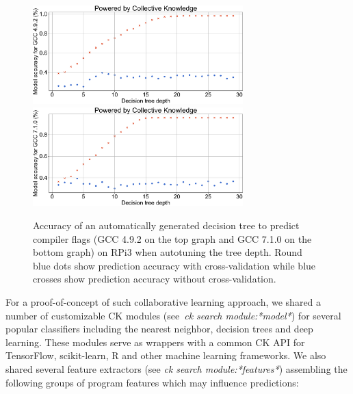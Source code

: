    \begin{figure}[!htbp]
     \centering
      \includegraphics[width=3.2in]
      {ck-assets/4d19bcd3cfe164ba-cropped.pdf} %
      \includegraphics[width=3.2in]
      {ck-assets/d2704b9bbf2441c8-cropped.pdf} %
     \caption{
      Accuracy of an automatically generated decision tree to predict compiler flags (GCC 4.9.2 on the top graph and GCC 7.1.0 on the bottom graph) 
      on RPi3 when autotuning the tree depth.
      Round blue dots show prediction accuracy with cross-validation while blue crosses show
      prediction accuracy without cross-validation.
     }
     \label{fig:ck-model-crowdtuning-gcc}
   \end{figure}

For a proof-of-concept of such collaborative learning approach, 
we shared a number of customizable CK modules (see~\emph{ck search module:*model*})
for several popular classifiers including the nearest neighbor,
decision trees and deep learning.
%
These modules serve as wrappers with a common CK API for
TensorFlow, scikit-learn, R and other machine learning frameworks.
%
We also shared several feature extractors (see \emph{ck search module:*features*}) 
assembling the following groups of program features
which may influence predictions:

